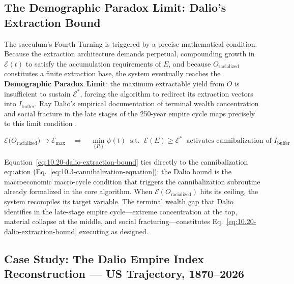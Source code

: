 \begin{table}[htbp]
\begin{tabular}{p{2.4cm} p{1.6cm} p{1.8cm} p{2.8cm} p{5.4cm}}
\bottomrule
\end{tabular}
\end{table}

\subsection*{The Demographic Paradox Limit: Dalio's Extraction Bound}

The saeculum's Fourth Turning is triggered by a precise mathematical condition. Because the extraction architecture demands perpetual, compounding growth in $\mathcal{E}(t)$ to satisfy the accumulation requirements of $E$, and because $O_{\text{racialized}}$ constitutes a finite extraction base, the system eventually reaches the \textbf{Demographic Paradox Limit}: the maximum extractable yield from $O$ is insufficient to sustain $\mathcal{E}^*$, forcing the algorithm to redirect its extraction vectors into $I_{\text{buffer}}$. Ray Dalio's empirical documentation of terminal wealth concentration and social fracture in the late stages of the 250-year empire cycle maps precisely to this limit condition \cite{dalio_2021}.

\begin{equation}\label{eq:10.20-dalio-extraction-bound}
\mathcal{E}\bigl(O_{\text{racialized}}\bigr) \to \mathcal{E}_{\max} \quad \Longrightarrow \quad \min_{\{P_i\}} \psi(t) \;\;\text{s.t.}\;\; \mathcal{E}(E) \geq \mathcal{E}^* \;\; \text{activates cannibalization of } I_{\text{buffer}}
\end{equation}

\noindent Equation~\eqref{eq:10.20-dalio-extraction-bound} ties directly to the cannibalization equation (Eq.~\eqref{eq:10.3-cannibalization-equation}): the Dalio bound is the macroeconomic macro-cycle condition that triggers the cannibalization subroutine already formalized in the core algorithm. When $\mathcal{E}(O_{\text{racialized}})$ hits its ceiling, the system recompiles its target variable. The terminal wealth gap that Dalio identifies in the late-stage empire cycle---extreme concentration at the top, material collapse at the middle, and social fracturing---constitutes Eq.~\eqref{eq:10.20-dalio-extraction-bound} executing as designed.

\subsection*{Case Study: The Dalio Empire Index Reconstruction --- US Trajectory, 1870--2026}
\label{cs:dalio_empire_index}

